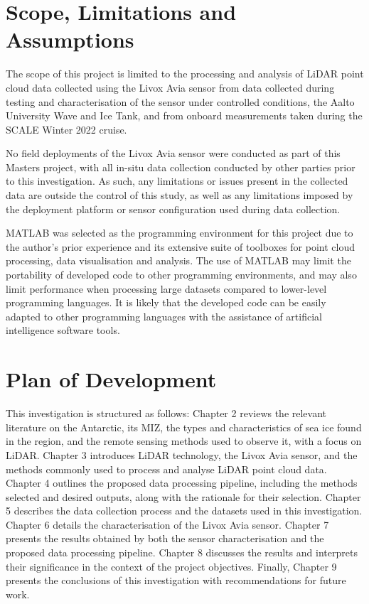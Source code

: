 \section{Scope, Limitations and Assumptions}
\label{sec:ch1.scope}

The scope of this project is limited to the processing and analysis of \ac{LiDAR} point cloud data collected using the Livox Avia sensor from data collected during testing and characterisation of the sensor under controlled conditions, the Aalto University Wave and Ice Tank, and from onboard measurements taken during the \ac{SCALE} Winter 2022 cruise.

No field deployments of the Livox Avia sensor were conducted as part of this Masters project, with all in-situ data collection conducted by other parties prior to this investigation. As such, any limitations or issues present in the collected data are outside the control of this study, as well as any limitations imposed by the deployment platform or sensor configuration used during data collection. 

MATLAB was selected as the programming environment for this project due to the author's prior experience and its extensive suite of toolboxes for point cloud processing, data visualisation and analysis. The use of MATLAB may limit the portability of developed code to other programming environments, and may also limit performance when processing large datasets compared to lower-level programming languages. It is likely that the developed code can be easily adapted to other programming languages with the assistance of artificial intelligence software tools.

\section{Plan of Development}
\label{sec:ch1.planofdevelopment}

This investigation is structured as follows: Chapter 2 reviews the relevant literature on the Antarctic, its \ac{MIZ}, the types and characteristics of sea ice found in the region, and the remote sensing methods used to observe it, with a focus on \ac{LiDAR}. Chapter 3 introduces \ac{LiDAR} technology, the Livox Avia sensor, and the methods commonly used to process and analyse \ac{LiDAR} point cloud data. Chapter 4 outlines the proposed data processing pipeline, including the methods selected and desired outputs, along with the rationale for their selection. Chapter 5 describes the data collection process and the datasets used in this investigation. Chapter 6 details the characterisation of the Livox Avia sensor. Chapter 7 presents the results obtained by both the sensor characterisation and the proposed data processing pipeline. Chapter 8 discusses the results and interprets their significance in the context of the project objectives. Finally, Chapter 9 presents the conclusions of this investigation with recommendations for future work.

